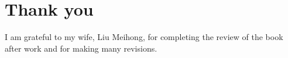 \section*{Thank you}

\begin{content}

I am grateful to my wife, Liu Meihong, for completing the review of the book after work and for making many revisions.

\end{content}